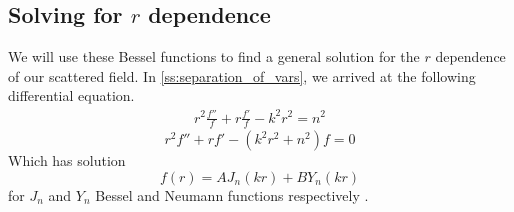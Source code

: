 \subsection{Solving for \texorpdfstring{$r$}{r} dependence}
We will use these Bessel functions to find a general solution for the $r$ dependence of our scattered field. In \ref{ss:separation_of_vars}, we arrived at the following differential equation.
    \begin{gather*}
       r^2 \frac{f''}{f} + r \frac{f'}{f} - k^2r^2 = n^2
    \end{gather*}
    \begin{equation}
        r^2 f'' + r f' -(k^2r^2 + n^2)f = 0
    \end{equation}
Which has solution
    \begin{equation}
        f(r) = A J_{n}(kr) + B Y_{n}(kr)
    \end{equation}
for $J_n$ and $Y_n$ Bessel and Neumann functions respectively \cite[Chapter~108]{zwillinger92handbook}.


